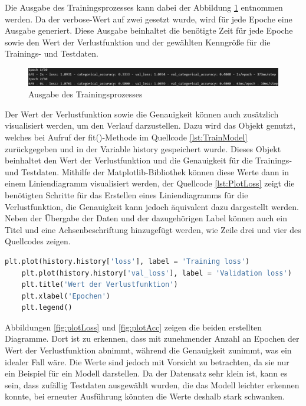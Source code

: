 Die Ausgabe des Trainingsprozesses kann dabei der Abbildung \ref*{fig:TrainModel} entnommen werden. Da der \glqq verbose\grqq{}-Wert auf zwei gesetzt wurde, wird für jede Epoche eine Ausgabe
generiert. Diese Ausgabe beinhaltet die benötigte Zeit für jede Epoche sowie den Wert der Verlustfunktion und der gewählten Kenngröße für die Trainings- und Testdaten.
\begin{figure}[H]
    \centering
    \includegraphics[width = \textwidth]{abbildungen/TrainAusgabe.png}
    \caption{Ausgabe des Trainingsprozesses}
    \label{fig:TrainModel}
\end{figure}
Der Wert der Verlustfunktion sowie die Genauigkeit können auch zusätzlich visualisiert werden, um den Verlauf darzustellen. Dazu wird das Objekt genutzt, welches bei Aufruf der 
fit()-Methode im Quellcode \ref*{lst:TrainModel} zurückgegeben und in der Variable \glqq history\grqq{} gespeichert wurde. Dieses Objekt beinhaltet 
den Wert der Verlustfunktion und die Genauigkeit für die Trainings- und Testdaten. Mithilfe der Matplotlib-Bibliothek können diese Werte dann in einem Liniendiagramm visualisiert werden,
der Quellcode \ref*{lst:PlotLoss} zeigt die benötigten Schritte für das Erstellen eines Liniendiagramms für die Verlustfunktion, die Genauigkeit kann jedoch äquivalent dazu 
dargestellt werden. Neben der Übergabe der Daten und der dazugehörigen Label können auch ein Titel und eine Achsenbeschriftung hinzugefügt werden, wie Zeile drei und vier des Quellcodes zeigen.
\begin{lstlisting}[language = python, caption={Trainieren des Modells},captionpos=b, label = lst:PlotLoss, float, floatplacement=H]
    plt.plot(history.history['loss'], label = 'Training loss')
    plt.plot(history.history['val_loss'], label = 'Validation loss')
    plt.title('Wert der Verlustfunktion')
    plt.xlabel('Epochen')
    plt.legend()
\end{lstlisting}
Abbildungen \ref*{fig:plotLoss} und \ref*{fig:plotAcc} zeigen die beiden erstellten Diagramme. Dort ist zu erkennen, dass mit zunehmender Anzahl an Epochen der Wert der Verlustfunktion abnimmt,
während die Genauigkeit zunimmt, was ein idealer Fall wäre. Die Werte sind jedoch mit Vorsicht zu betrachten, da sie nur ein Beispiel für ein Modell darstellen.
Da der Datensatz sehr klein ist, kann es sein, dass zufällig Testdaten ausgewählt wurden, die das Modell leichter erkennen konnte, bei erneuter Ausführung könnten die 
Werte deshalb stark schwanken.

